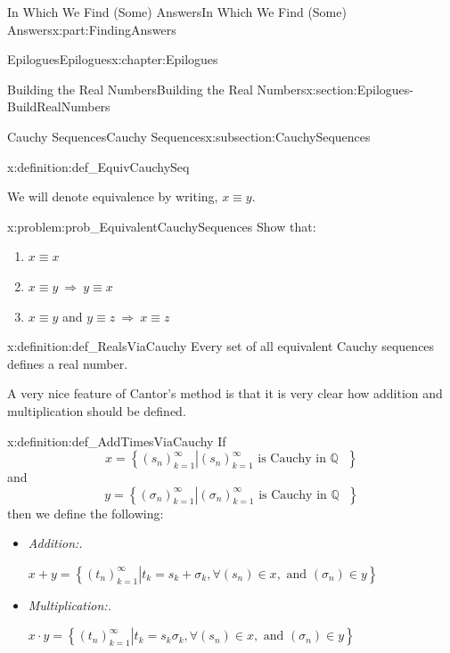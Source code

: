 \documentclass[oneside,10pt,]{book}
\newcommand{\lititle}[1]{{\slshape#1}}
\numberwithin{equation}{section}
\newcommand{\imp}{\ \Rightarrow\ }
\newcommand{\QQ}{\mathbb {Q}}
\begin{document}
\begin{partptx}{In Which We Find (Some) Answers}{}{In Which We Find (Some) Answers}{}{}{x:part:FindingAnswers}
\begin{chapterptx}{Epilogues}{}{Epilogues}{}{}{x:chapter:Epilogues}
\begin{sectionptx}{Building the Real Numbers}{}{Building the Real Numbers}{}{}{x:section:Epilogues-BuildRealNumbers}
\begin{subsectionptx}{Cauchy Sequences}{}{Cauchy Sequences}{}{}{x:subsection:CauchySequences}
\begin{definition}{}{x:definition:def_EquivCauchySeq}
%
\par
We will denote equivalence by writing, \(x\equiv y\).%
\end{definition}
\begin{problem}{}{x:problem:prob_EquivalentCauchySequences}%
Show that:%
\begin{enumerate}[font=\bfseries,label=(\alph*),ref=\alph*]
\item{}\(x\equiv x\)%
\item{}\(x\equiv y \imp y\equiv x\)%
\item{}\(x\equiv y\) and \(y\equiv z \imp x\equiv z\)%
\end{enumerate}
\end{problem}
\begin{definition}{}{x:definition:def_RealsViaCauchy}%
 Every set of all equivalent Cauchy sequences defines a real number.%
\end{definition}
A very nice feature of Cantor's method is that it is very clear how addition and multiplication should be defined.%
\begin{definition}{}{x:definition:def_AddTimesViaCauchy}%
 If%
\begin{equation*}
x= \left\{\left.\left(s_n\right)_{k=1}^\infty \right| \left(s_n\right)_{k=1}^\infty \text{ is Cauchy in \(\QQ\) } \right\}
\end{equation*}
and%
\begin{equation*}
y= \left\{\left.\left(\sigma_n\right)_{k=1}^\infty \right| \left(\sigma_n\right)_{k=1}^\infty \text{ is Cauchy in \(\QQ\) } \right\}
\end{equation*}
then we define the following:%
\begin{itemize}[label=\textbullet]
\item{}\lititle{Addition:.}\par%
\(\displaystyle x+y = \left\{\left.\left(t_n\right)_{k=1}^\infty \right| t_k = s_k+\sigma_k, \forall (s_n) \in x, \text{ and } (\sigma_n)\in y\right\}\)%
\item{}\lititle{Multiplication:.}\par%
\(\displaystyle x\cdot y = \left\{\left.\left(t_n\right)_{k=1}^\infty \right| t_k = s_k\sigma_k, \forall (s_n) \in x, \text{ and } (\sigma_n)\in y\right\}\)%
\end{itemize}
%
\end{definition}

\end{subsectionptx}
\end{sectionptx}
\end{chapterptx}
\end{partptx}
\end{document}
